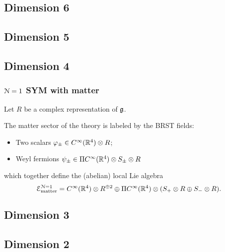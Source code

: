 \documentclass[10pt, oneside]{article}
\begin{document}
\subsection{Dimension 6}



\subsection{Dimension 5}


\subsection{Dimension 4}


\subsubsection{$\mathcal N=1$ SYM with matter} 

Let $R$ be a complex representation of $\mathfrak{g}$.

The matter sector of the theory is labeled by the BRST fields:
\begin{itemize}
\item Two scalars $\varphi_{\pm} \in C^\infty (\mathbb R^4) \otimes R$;
\item Weyl fermions $\psi_{\pm} \in \Pi C^\infty(\mathbb R^4) \otimes S_{\pm} \otimes R$ 
\end{itemize} 
which together define the (abelian) local Lie algebra
\[
\mathcal E_{\rm matter}^{\mathcal N=1} = C^\infty (\mathbb R^4) \otimes R^{\oplus 2} \oplus  \Pi C^\infty(\mathbb R^4) \otimes (S_{+}  \otimes R \oplus S_- \otimes R) .
\]
\subsection{Dimension 3}


\subsection{Dimension 2}
\end{document}
